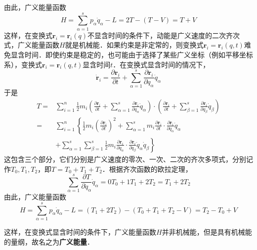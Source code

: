 由此，广义能量函数
\begin{equation}
H=\sum_{\alpha=1}^{s} p_{\alpha} \dot{q}_{\alpha}-L=2 T-(T-V)=T+V
\end{equation}
这样，在变换式$\boldsymbol{r}_{i}=\boldsymbol{r}_{i}(q)$不显含时间的条件下，动能是广义速度的二次齐次式，广义能量函数$H $就是机械能．如果约束是非定常的，则变换式$\boldsymbol{r}_{i}=\boldsymbol{r}_{i}(q, t)$难免显含时间．即使约束是稳定的，也可能由于选择了某些广义坐标（例如平移坐标系），变换式$\boldsymbol{r}_{i}=\boldsymbol{r}_{i}(q, t)$显含时间$t $．在变换式显含时间的情况下，
\begin{equation}
\dot{\boldsymbol r}_{i}=\frac{\partial \boldsymbol{r}_{i}}{\partial t}+\sum_{\alpha=1}^{s} \frac{\partial \boldsymbol{r}_{i}}{\partial q_{\alpha}} \dot{q}_{\alpha}
\end{equation}
于是
\begin{equation}
\begin{aligned} T=& \sum_{i=1}^{n} \frac{1}{2} m_{i}\left(\frac{\partial \boldsymbol{r}_{i}}{\partial t}+\sum_{\alpha=1}^{s} \frac{\partial \boldsymbol{r}_{i}}{\partial q_{\alpha}} \dot{q}_{\alpha}\right) \cdot\left(\frac{\partial \boldsymbol{r}_{i}}{\partial t}+\sum_{\beta=1}^{s} \frac{\partial \boldsymbol{r}_{i}}{\partial q_{\beta}} \dot{q}_{\beta}\right) \\=& \sum_{i=1}^{n}\left\{\frac{1}{2} m_{i}\left(\frac{\partial \boldsymbol{r}_{i}}{\partial t}\right)^{2}+\sum_{\alpha=1}^{s} m_{i} \frac{\partial \boldsymbol{r}_{i}}{\partial t} \cdot \frac{\partial \boldsymbol{r}_{i}}{\partial q_{\alpha}} \dot{q}_{\alpha}\right.\\ &\left.+\sum_{\alpha=1}^{s} \sum_{\beta=1}^{s} \frac{1}{2} m_{i} \frac{\partial \boldsymbol{r}_{i}}{\partial q_{\alpha}} \cdot \frac{\partial \boldsymbol{r}_{i}}{\partial q_{\beta}} \dot{q}_{\alpha} \dot{q}_{\beta}\right\} \end{aligned}
\end{equation}
这包含三个部分，它们分别是广义速度的零次、一次、二次的齐次多项式，分别记作$T_0,T_1,T_2$，即$T=T_0+T_1+T_2$．根据齐次函数的欧拉定理，
\begin{equation}
\sum_{\alpha=1}^{s} \frac{\partial T}{\partial \dot{q}_{\alpha}} \dot{q}_{\alpha}=0 T_{0}+1 T_{1}+2 T_{2}=T_{1}+2 T_{2}
\end{equation}
由此，广义能量函数
\begin{equation}
H=\sum_{\alpha=1}^{s} p_{\alpha} \dot{q}_{\alpha}-L=\left(T_{1}+2 T_{2}\right)-\left(T_{0}+T_{1}+T_{2}-V\right)=T_{2}-T_{0}+V
\end{equation}

这样，在变换式显含时间的条件下，广义能量函数$H $并非机械能，但是具有机械能的量纲，故名之为\textbf{广义能量}．

